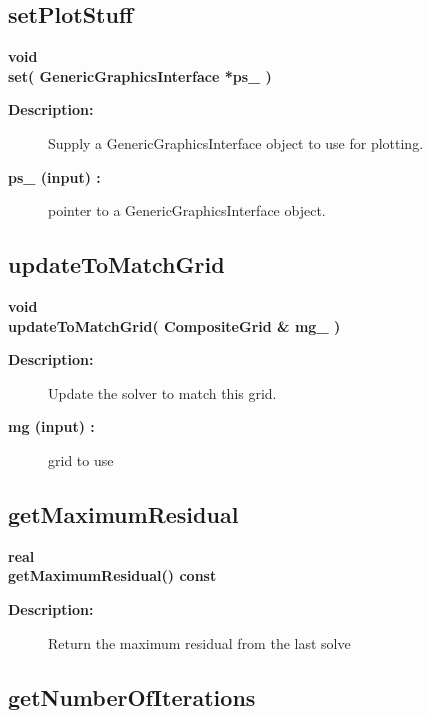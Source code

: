 \subsection{setPlotStuff}
 
\begin{flushleft} \textbf{%
void  \\ 
\settowidth{\OgmgIncludeArgIndent}{set(}%
set( GenericGraphicsInterface *ps\_ )
}\end{flushleft}
\begin{description}
\item[{\bf Description:}] 
    Supply a GenericGraphicsInterface object to use for plotting.
\item[{\bf ps\_ (input) :}]  pointer to a GenericGraphicsInterface object.
\end{description}
\subsection{updateToMatchGrid}
 
\begin{flushleft} \textbf{%
void  \\ 
\settowidth{\OgmgIncludeArgIndent}{updateToMatchGrid(}%
updateToMatchGrid( CompositeGrid \& mg\_ )
}\end{flushleft}
\begin{description}
\item[{\bf Description:}] 
    Update the solver to match this grid.
\item[{\bf mg (input) :}]  grid to use
\end{description}
\subsection{getMaximumResidual}
 
\begin{flushleft} \textbf{%
real  \\ 
\settowidth{\OgmgIncludeArgIndent}{getMaximumResidual(}%
getMaximumResidual() const
}\end{flushleft}
\begin{description}
\item[{\bf Description:}]  
   Return the maximum residual from the last solve
\end{description}
\subsection{getNumberOfIterations}
 
